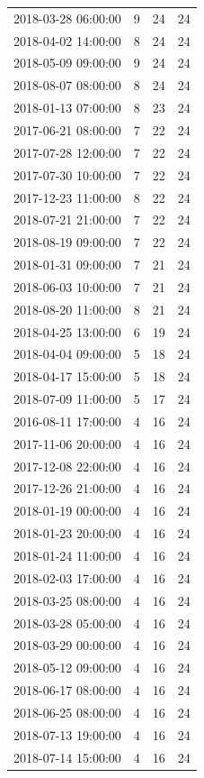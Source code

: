 \begin{tabular}{lrrr}
2018-03-28 06:00:00 & 9 & 24 & 24 \\
2018-04-02 14:00:00 & 8 & 24 & 24 \\
2018-05-09 09:00:00 & 9 & 24 & 24 \\
2018-08-07 08:00:00 & 8 & 24 & 24 \\
2018-01-13 07:00:00 & 8 & 23 & 24 \\
2017-06-21 08:00:00 & 7 & 22 & 24 \\
2017-07-28 12:00:00 & 7 & 22 & 24 \\
2017-07-30 10:00:00 & 7 & 22 & 24 \\
2017-12-23 11:00:00 & 8 & 22 & 24 \\
2018-07-21 21:00:00 & 7 & 22 & 24 \\
2018-08-19 09:00:00 & 7 & 22 & 24 \\
2018-01-31 09:00:00 & 7 & 21 & 24 \\
2018-06-03 10:00:00 & 7 & 21 & 24 \\
2018-08-20 11:00:00 & 8 & 21 & 24 \\
2018-04-25 13:00:00 & 6 & 19 & 24 \\
2018-04-04 09:00:00 & 5 & 18 & 24 \\
2018-04-17 15:00:00 & 5 & 18 & 24 \\
2018-07-09 11:00:00 & 5 & 17 & 24 \\
2016-08-11 17:00:00 & 4 & 16 & 24 \\
2017-11-06 20:00:00 & 4 & 16 & 24 \\
2017-12-08 22:00:00 & 4 & 16 & 24 \\
2017-12-26 21:00:00 & 4 & 16 & 24 \\
2018-01-19 00:00:00 & 4 & 16 & 24 \\
2018-01-23 20:00:00 & 4 & 16 & 24 \\
2018-01-24 11:00:00 & 4 & 16 & 24 \\
2018-02-03 17:00:00 & 4 & 16 & 24 \\
2018-03-25 08:00:00 & 4 & 16 & 24 \\
2018-03-28 05:00:00 & 4 & 16 & 24 \\
2018-03-29 00:00:00 & 4 & 16 & 24 \\
2018-05-12 09:00:00 & 4 & 16 & 24 \\
2018-06-17 08:00:00 & 4 & 16 & 24 \\
2018-06-25 08:00:00 & 4 & 16 & 24 \\
2018-07-13 19:00:00 & 4 & 16 & 24 \\
2018-07-14 15:00:00 & 4 & 16 & 24 \\

\end{tabular}
